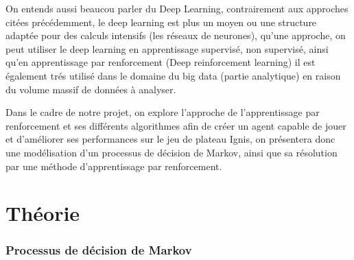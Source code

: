\documentclass[a4paper,10pt]{article}
\begin{document}
\par
On entends aussi beaucou parler du Deep Learning, contrairement aux approches citées précédemment, le deep learning est plus un moyen ou une structure adaptée pour des calculs intensifs (les réseaux de neurones), qu'une approche, on peut utiliser le deep learning en apprentissage supervisé, non supervisé, ainsi qu'en apprentissage par renforcement (Deep reinforcement learning) il est également trés utilisé dans le domaine du big data (partie analytique) en raison du volume massif de données à analyser.


\par
Dans le cadre de notre projet, on explore l'approche de l'apprentissage par renforcement et ses différents algorithmes afin de créer un agent capable de jouer et d'améliorer ses performances sur le jeu de plateau Ignis, on présentera donc une modélisation d'un processus de décision de Markov, ainsi que sa résolution par une méthode d'apprentissage par renforcement.


\part{Théorie}
\section{Processus de décision de Markov}
\end{document}
